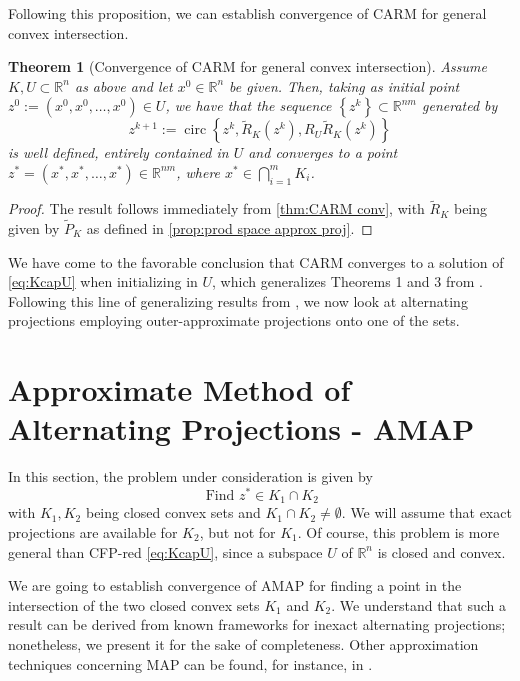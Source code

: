 \documentclass[smallextended,numbook,nospthms]{svjour3}
\theoremstyle{plain}
\newtheorem{theorem}{Theorem}[section]
\theoremstyle{definition}
\def\RR{\mathds R}
\DeclareMathOperator{\circum}{circ}
\begin{document}
Following this proposition, we can establish convergence of CARM for general convex intersection.

\begin{theorem}[Convergence of CARM for general convex intersection]\label{thm:CARM conv general}
Assume $K, U \subset \RR^{n}$ as above and let $x^{0} \in \RR^{n}$ be given. Then, taking as initial point $z^{0}:=\left(x^{0}, x^{0}, \ldots, x^{0}\right) \in U$, we have that the sequence $\left\{z^{k}\right\} \subset \RR^{nm}$ generated by
\[
z^{k+1}:=\circum\left\{z^{k}, \tilde{R}_{K}\left(z^{k}\right), R_{U}\tilde{R}_{K}\left(z^{k}\right)\right\}
\]
is well defined, entirely contained in $U$ and converges to a point $z^{*}=\left(x^{*}, x^{*}, \ldots, x^{*}\right) \in \RR^{nm}$, where $x^{*} \in \bigcap_{i=1}^{m} K_{i}$.
\end{theorem}
\begin{proof}
The result follows immediately from \cref{thm:CARM conv}, with $\tilde{R}_{K}$ being given by $\tilde{P}_{K}$ as defined in \cref{prop:prod space approx proj}.
\end{proof}

We have come to the favorable conclusion that CARM converges to a solution of \cref{eq:KcapU} when initializing in $U$, which generalizes Theorems 1 and 3 from \cite{Behling:2020}. Following this line of generalizing results from \cite{Behling:2020}, we now look at alternating projections employing outer-approximate projections onto one of the sets. 



\newpage
\section{Approximate Method of Alternating Projections - AMAP}\label{sec:AMAP}
In this section, the problem under consideration is given by
$$
\text { Find } z^{*} \in K_1 \cap K_2
$$
with $K_1, K_2$ being closed convex sets and $K_1 \cap K_2 \not = \emptyset$. We will assume that exact projections are available for $K_2$, but not for $K_1$. Of course, this problem is more general than CFP-red \cref{eq:KcapU}, since a subspace $U$ of $\RR^{n}$ is closed and convex. 

We are going to establish convergence of AMAP for finding a point in the intersection of the two closed convex sets $K_1$ and $K_2$. We understand that such a result can be derived from known frameworks for inexact alternating projections; nonetheless, we present it for the sake of completeness. Other approximation techniques concerning MAP can be found, for instance, in \cite{Luke:2012, Luke:2013}.
\end{document}
